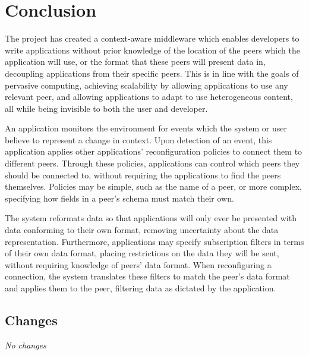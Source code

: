 \documentclass[12pt,twoside,notitlepage]{report}
\begin{document}




\cleardoublepage

\chapter{Conclusion}

The project has created a context-aware middleware which enables developers to write applications without prior knowledge of the location of the peers which the application will use, or the format that these peers will present data in, decoupling applications from their specific peers. 
This is in line with the goals of pervasive computing, achieving scalability by allowing applications to use any relevant peer, and allowing applications to adapt to use heterogeneous content, all while being invisible to both the user and developer.

An application monitors the environment for events which the system or user believe to represent a change in context.
Upon detection of an event, this application applies other applications' reconfiguration policies to connect them to different peers. 
Through these policies, applications can control which peers they should be connected to, without requiring the applications to find the peers themselves.
Policies may be simple, such as the name of a peer, or more complex, specifying how fields in a peer's schema must match their own. 

The system reformats data so that applications will only ever be presented with data conforming to their own format, removing uncertainty about the data representation. 
Furthermore, applications may specify subscription filters in terms of their own data format, placing restrictions on the data they will be sent, without requiring knowledge of peers' data format.
When reconfiguring a connection, the system translates these filters to match the peer's data format and applies them to the peer, filtering data as dictated by the application.

\section{Changes}
{\sl No changes}
\end{document}

